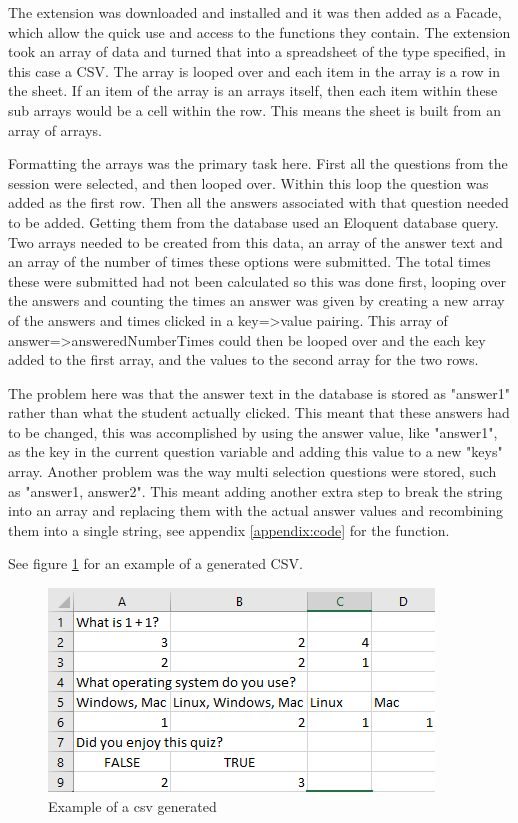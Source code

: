 The extension was downloaded and installed and it was then added as a Facade\cite{laravel-facades}, which allow the quick use and access to the functions they contain. The extension took an array of data and turned that into a spreadsheet of the type specified, in this case a CSV. The array is looped over and each item in the array is a row in the sheet. If an item of the array is an arrays itself, then each item within these sub arrays would be a cell within the row. This means the sheet is built from an array of arrays. 

Formatting the arrays was the primary task here. First all the questions from the session were selected, and then looped over. Within this loop the question was added as the first row. Then all the answers associated with that question needed to be added. Getting them from the database used an Eloquent database query. Two arrays needed to be created from this data, an array of the answer text and an array of the number of times these options were submitted. The total times these were submitted had not been calculated so this was done first, looping over the answers and counting the times an answer was given by creating a new array of the answers and times clicked in a key=>value pairing. This array of answer=>answeredNumberTimes could then be looped over and the each key added to the first array, and the values to the second array for the two rows.

The problem here was that the answer text in the database is stored as "answer1" rather than what the student actually clicked. This meant that these answers had to be changed, this was accomplished by using the answer value, like "answer1", as the key in the current question variable and adding this value to a new "keys" array. Another problem was the way multi selection questions were stored, such as "answer1, answer2". This meant adding another extra step to break the string into an array and replacing them with the actual answer values and recombining them into a single string, see appendix \ref{appendix:code} for the function.

See figure \ref{fig:csv-example} for an example of a generated CSV.
\begin{figure}[H]
	\caption{Example of a csv generated}
	\centerline{\includegraphics{Chapter2/Iter-10/csv-example}}
	\label{fig:csv-example}
\end{figure}

